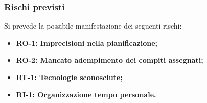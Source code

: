 \documentclass[a4paper,12pt]{article}
\begin{document}
    \subsubsection{Rischi previsti}{
        Si prevede la possibile manifestazione dei seguenti rischi:
        \begin{itemize}
            \item \textbf{RO-1: Imprecisioni nella pianificazione;}
            \item \textbf{RO-2: Mancato adempimento dei compiti assegnati;}
            \item \textbf{RT-1: Tecnologie sconosciute;}
            \item \textbf{RI-1: Organizzazione tempo personale.}
        \end{itemize}
    }


    
\end{document}
